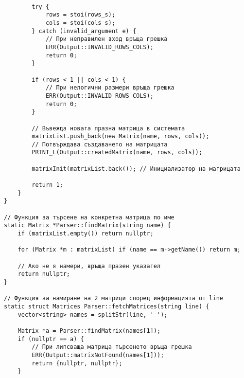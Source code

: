 \documentclass[oneside]{book}
\begin{document}
\begin{mdframed}\begin{lstlisting}[firstnumber=last]
		
		try {
			rows = stoi(rows_s);
			cols = stoi(cols_s);
		} catch (invalid_argument e) {
			// При неправилен вход връща грешка
			ERR(Output::INVALID_ROWS_COLS);
			return 0;
		}

		if (rows < 1 || cols < 1) {
			// При нелогични размери връща грешка
			ERR(Output::INVALID_ROWS_COLS);
			return 0;
		}

		// Въвежда новата празна матрица в системата
		matrixList.push_back(new Matrix(name, rows, cols));
		// Потвърждава създаването на матрицата
		PRINT_L(Output::createdMatrix(name, rows, cols));

		matrixInit(matrixList.back()); // Инициализатор на матрицата

		return 1;
	}
}

// Функция за търсене на конкретна матрица по име
static Matrix *Parser::findMatrix(string name) {
	if (matrixList.empty()) return nullptr;

	for (Matrix *m : matrixList) if (name == m->getName()) return m;

	// Ако не я намери, връща празен указател
	return nullptr;
}

// Функция за намиране на 2 матрици според информацията от line
static struct Matrices Parser::fetchMatrices(string line) {
	vector<string> names = splitStr(line, ' ');

	Matrix *a = Parser::findMatrix(names[1]);
	if (nullptr == a) {
		// При липсваща матрица търсенето връща грешка
		ERR(Output::matrixNotFound(names[1]));
		return {nullptr, nullptr};
	}
\end{lstlisting}\end{mdframed}
\pagebreak
\end{document}
